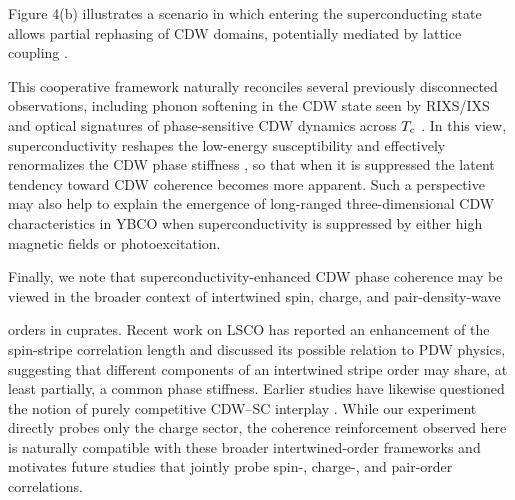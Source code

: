 \documentclass[floatfix,aps,twocolumn,preprintnumbers,superscriptaddress,floatfix,prl]{revtex4-2}
\begin{document}
Figure 4(b) illustrates a scenario in which entering the superconducting state allows partial rephasing of CDW domains, potentially mediated by lattice coupling \cite{Kivelson1,McMillan1976,TonerNelson1981,Zachar1998,NPhys2007}.

This cooperative framework naturally reconciles several previously disconnected observations, including phonon softening in the CDW state seen by RIXS/IXS \cite{Lee2,Arpaia1,Tacon1,Kim1,Reznik1,Pintschovius1,Devereaux1,Chaix1} and optical signatures of phase-sensitive CDW dynamics across $T_{\rm c}$ \cite{Sugai1,Torchinsky1,Nguyen1,Wandel1,Jang2}. In this view, superconductivity reshapes the low-energy susceptibility and effectively renormalizes the CDW phase stiffness \cite{Arpaia1,Tacon1,Reznik2}, so that when it is suppressed the latent tendency toward CDW coherence becomes more apparent. Such a perspective may also help to explain the emergence of long-ranged three-dimensional CDW characteristics \cite{Wu3,Gerber1,Chang2} in YBCO when superconductivity is suppressed by either high magnetic fields or photoexcitation.

Finally, we note that superconductivity-enhanced CDW phase coherence may be viewed in the broader context of intertwined spin, charge, and pair-density-wave

orders in cuprates. Recent work on LSCO \cite{arxivLSCO} has reported an enhancement of the spin-stripe correlation length and discussed its possible relation to PDW physics, suggesting that different components of an intertwined stripe order may share, at least partially, a common phase stiffness. Earlier studies have likewise questioned the notion of purely competitive CDW–SC interplay \cite{NPhys2007,AdvMater2024}. While our experiment directly probes only the charge sector, the coherence reinforcement observed here is naturally compatible with these broader intertwined-order frameworks and motivates future studies that jointly probe spin-, charge-, and pair-order correlations.
\end{document}
